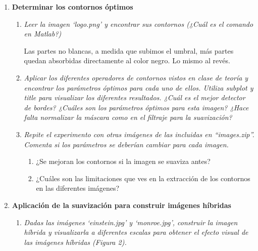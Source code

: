 \documentclass{article}
\begin{document}
\begin{enumerate}
\begin{enumerate}
 \end{enumerate}

\newpage

 \item \textbf{Determinar los contornos óptimos }

 \begin{enumerate}
 \item \textit{Leer  la  imagen  ‘logo.png’ y  encontrar  sus  contornos (¿Cuál  es  el  comando  en 
Matlab?)}

 Las partes no blancas, a medida que subimos el umbral, más partes quedan absorbidas directamente al color negro. Lo mismo al revés.

 \item \textit{Aplicar  los  diferentes  operadores  de  contornos  vistos  en  clase  de  teoría  y 
encontrar los parámetros óptimos para cada uno de ellos. Utiliza subplot y title
para visualizar los diferentes resultados.
¿Cuál es el mejor detector de bordes? ¿Cuáles son los parámetros óptimos para 
esta  imagen? ¿Hace  falta  normalizar  la  máscara  como  en  el  filtraje  para  la 
suavización?}

 \item \textit{Repite  el  experimento  con  otras  imágenes  de  las  incluidas  en  “images.zip”. 
Comenta si los parámetros se deberían cambiar para cada imagen. }
 \begin{enumerate}
  \item ¿Se mejoran los contornos si la imagen se suaviza antes?
  
  
  \item ¿Cuáles son las limitaciones que ves en la extracción de los contornos en las diferentes imágenes?
 \end{enumerate}
 
  
  
 \end{enumerate}

\newpage

 \item \textbf{Aplicación  de  la  suavización  para  construir imágenes híbridas} 
 
 \begin{enumerate}
 \item \textit{Dadas  las  imágenes  ‘einstein.jpg’ y  ‘monroe.jpg’,  construir  la  imagen  híbrida  y 
visualizarla a diferentes escalas para  obtener el efecto  visual de las imágenes híbridas 
(Figura 2).}  
 

\end{enumerate}
\end{enumerate}
\end{document}
